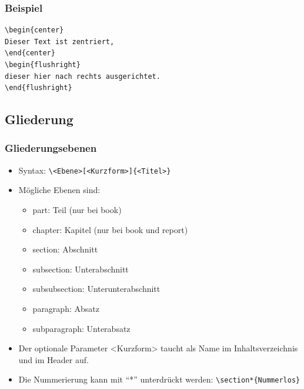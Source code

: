 \begin{frame}[fragile,t]
  \frametitle{Beispiel}
  \begin{lstlisting}[style=Latex]
\begin{center}
Dieser Text ist zentriert,
\end{center}
\begin{flushright}
dieser hier nach rechts ausgerichtet.
\end{flushright}
\end{lstlisting}\vspace{-20pt}
  \pause
{}
\end{frame}

\subsection{Gliederung}


\begin{frame}[fragile]
\frametitle{Gliederungsebenen}
\begin{itemize}[<+->]
  \item Syntax: \lstinline[style=Latex]+\<Ebene>[<Kurzform>]{<Titel>}+
  \item Mögliche Ebenen sind:
  \begin{itemize}
    \item part: Teil (nur bei book)
    \item chapter: Kapitel (nur bei book und report)
    \item section: Abschnitt
    \item subsection: Unterabschnitt
    \item subsubsection: Unterunterabschnitt
    \item paragraph: Absatz
    \item subparagraph: Unterabsatz
  \end{itemize}
  \item Der optionale Parameter <Kurzform> taucht als Name im Inhaltsverzeichnis und im Header auf.
  \item Die Nummerierung kann mit ``*'' unterdrückt werden: \lstinline[style=Latex]+\section*{Nummerlos}+
\end{itemize}
\end{frame}
